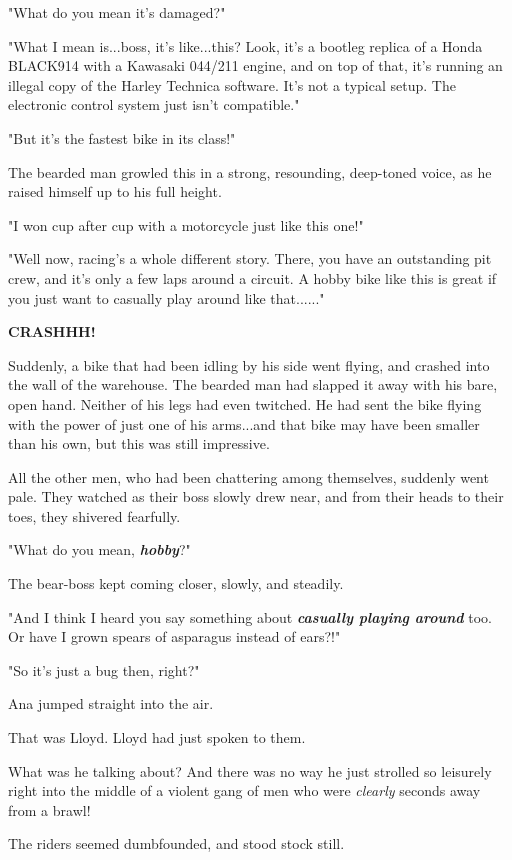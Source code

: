 \documentclass[
]{article}
\begin{document}
"What do you mean it's damaged?"

"What I mean is...boss, it's like...this? Look, it's a bootleg replica
of a Honda BLACK914 with a Kawasaki 044/211 engine, and on top of that,
it's running an illegal copy of the Harley Technica software. It's not a
typical setup. The electronic control system just isn't compatible."

"But it's the fastest bike in its class!"

The bearded man growled this in a strong, resounding, deep-toned voice,
as he raised himself up to his full height.

"I won cup after cup with a motorcycle just like this one!"

"Well now, racing's a whole different story. There, you have an
outstanding pit crew, and it's only a few laps around a circuit. A hobby
bike like this is great if you just want to casually play around like
that......"

\textbf{CRASHHH!}

Suddenly, a bike that had been idling by his side went flying, and
crashed into the wall of the warehouse. The bearded man had slapped it
away with his bare, open hand. Neither of his legs had even twitched. He
had sent the bike flying with the power of just one of his arms...and
that bike may have been smaller than his own, but this was still
impressive.

All the other men, who had been chattering among themselves, suddenly
went pale. They watched as their boss slowly drew near, and from their
heads to their toes, they shivered fearfully.

"What do you mean, \emph{\textbf{hobby}}?"

The bear-boss kept coming closer, slowly, and steadily.

"And I think I heard you say something about \emph{\textbf{casually
playing around}} too. Or have I grown spears of asparagus instead of
ears?!"

"So it's just a bug then, right?"

Ana jumped straight into the air.

That was Lloyd. Lloyd had just spoken to them.

What was he talking about? And there was no way he just strolled so
leisurely right into the middle of a violent gang of men who were
\emph{clearly} seconds away from a brawl!

The riders seemed dumbfounded, and stood stock still.
\end{document}

